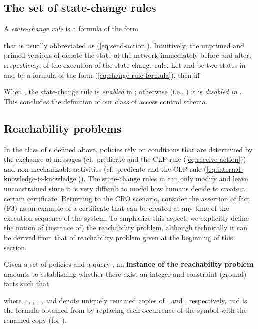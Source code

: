 \documentclass[conference]{llncs}
\newcommand{\CRO}{CRO}
\begin{document}
\subsection{The set  of state-change rules} 
\label{subset:setofstatechangerules}
A \emph{state-change
rule} is a formula of the form

that is usually abbreviated as (\ref{eq:send-action}).  Intuitively,
the unprimed and primed versions of  denote the state of the
network immediately before and after, respectively, of the execution
of the state-change rule.  Let  and  be two states in 
and  be a formula of the form (\ref{eq:change-rule-formula}),
then  iff

When , the state-change rule is \emph{enabled} in
; otherwise (i.e., ) it is \emph{disabled in
  }.  This concludes the definition of our class of access
control schema. 

\subsection{Reachability problems} 
In the class of s defined above, 
policies rely on conditions that are
determined by the exchange of messages (cf.\ predicate  and the
CLP rule (\ref{eq:receive-action})) and non-mechanizable activities
(cf.\ predicate  and the CLP rule
(\ref{eq:internal-knowledge-is-knowledge})). The state-change rules in
 can only modify  and leave  unconstrained since
it is very difficult to model how humans decide to
create a certain certificate. 
Returning to the \CRO{} scenario, consider the assertion of fact (F3) as an example of
a certificate that can be created at any time of the execution sequence of the system. 
To emphasize this aspect, we explicitly define the notion of (instance of)  the reachability problem, although technically it can be derived from that of  reachability problem given at the beginning of this
section.

\begin{definition}
\label{def:instofreachprob}
Given a set  of policies and a query , an
  \textbf{instance of the reachability problem} amounts to
  establishing whether there exist an integer  and constraint (ground)
   facts 
   such that
  
where , , , , , and
   denote uniquely renamed copies of , and
  , respectively, and  is the formula obtained
  from  by replacing each occurrence of the symbol  with
  the renamed copy  (for ).  
  \end{definition}
\end{document}
